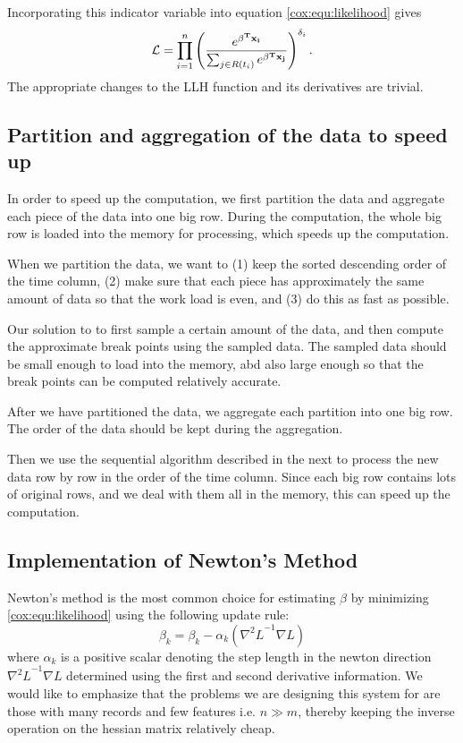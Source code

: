 Incorporating this indicator variable into equation \ref{cox:equ:likelihood} gives
\begin{equation}\label{cox:equ:likelihood-censoring}
\mathcal{L} = \prod_{i = 1}^n \left(  \frac{e^{\bold{\beta^T x_i} }}{ \sum_{j \in R(t_i)} e^{\bold{\beta^T x_j}}} \right)^{\delta_i}.
\end{equation}
The appropriate changes to the LLH function and its derivatives are trivial.


\subsection{Partition and aggregation of the data to speed up}

In order to speed up the computation, we first partition the data and
aggregate each piece of the data into one big row. During the
computation, the whole big row is loaded into the memory for
processing, which speeds up the computation.

When we partition the data, we want to (1) keep the sorted descending
order of the time column, (2) make sure that each piece has
approximately the same amount of data so that the work load is even,
and (3) do this as fast as possible.

Our solution to to first sample a certain amount of the data, and then
compute the approximate break points using the sampled data. The
sampled data should be small enough to load into the memory, abd also
large enough so that the break points can be computed relatively
accurate.

After we have partitioned the data, we aggregate each partition into
one big row. The order of the data should be kept during the
aggregation.

Then we use the sequential algorithm described in the next to process
the new data row by row in the order of the time column. Since each
big row contains lots of original rows, and we deal with them all in
the memory, this can speed up the computation.


\subsection{Implementation of Newton's Method}
Newton's method is the most common choice for estimating $\beta$ by minimizing
\ref{cox:equ:likelihood} using the following update rule:
\begin{equation}
\beta_{k} = \beta_{k} - \alpha_k \left( {\nabla^2 L}^{-1} \nabla L \right)
\end{equation}
where $\alpha_k$ is a positive scalar denoting the step length in the newton
direction ${\nabla^2 L}^{-1} \nabla L$ determined using the first and second
derivative information. We would like to emphasize that the problems we are
designing this system for are those with many records and few features i.e. $n
\gg m$, thereby keeping the inverse operation on the hessian matrix relatively
cheap.

